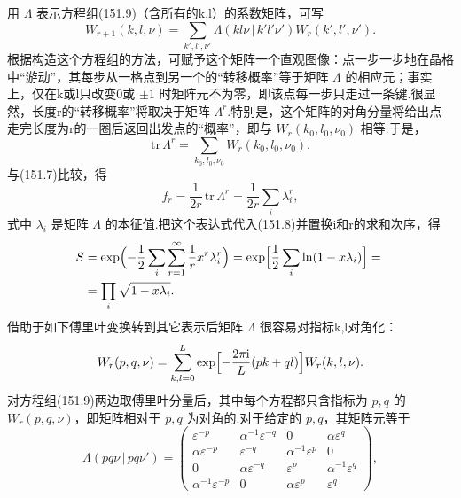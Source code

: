 用 $\Lambda$ 表示方程组(151.9)（含所有的k,l）的系数矩阵，可写
\begin{equation*}
  W_{r+1}(k,l,\nu)=\sum_{k',l',\nu'}
  \Lambda(kl\nu\,|\,k'l'\nu')W_r(k',l',\nu').
\end{equation*}
根据构造这个方程组的方法，可赋予这个矩阵一个直观图像：点一步一步地在晶格中“游动”，其每步从一格点到另一个的“转移概率”等于矩阵 $\Lambda$ 的相应元；事实上，仅在k或l只改变0或 $\pm1$ 时矩阵元不为零，即该点每一步只走过一条键.很显然，长度r的“转移概率”将取决于矩阵 $\Lambda^r$.特别是，这个矩阵的对角分量将给出点走完长度为r的一圈后返回出发点的“概率”，即与 $W_r(k_0,l_0,\nu_0)$ 相等.于是，
\begin{equation*}
  \mathrm{tr}\,\Lambda^r=\sum_{k_0,l_0,\nu_0}W_r(k_0,l_0,\nu_0).
\end{equation*}
与(151.7)比较，得
\begin{equation*}
  f_r=\frac{1}{2r}\,\mathrm{tr}\,\Lambda^r
  =\frac{1}{2r}\sum_i\lambda_i^r,
\end{equation*}
式中 $\lambda_i$ 是矩阵 $\Lambda$ 的本征值.把这个表达式代入(151.8)并置换i和r的求和次序，得
\begin{equation}
\begin{aligned}
  S&=\exp\Bigl(-\frac{1}{2}\sum_i\sum_{r=1}^{\infty}\frac{1}{r}x^r\lambda_i^r\Bigr)
  =\exp\Bigl[\frac{1}{2}\sum_i\ln(1-x\lambda_i)\Bigr]={}\\
  &=\prod_i\sqrt{1-x\lambda_i}.
\end{aligned}
\end{equation}
借助于如下傅里叶变换转到其它表示后矩阵 $\Lambda$ 很容易对指标k,l对角化：
\begin{equation*}
  W_r(p,q,\nu)=\sum_{k,l=0}^{L}
  \exp\Bigl[-\frac{2\pi\mathrm{i}}{L}(pk+ql)\Bigr]W_r(k,l,\nu).
\end{equation*}
对方程组(151.9)两边取傅里叶分量后，其中每个方程都只含指标为 $p,q$ 的 $W_r(p,q,\nu)$，即矩阵相对于 $p,q$ 为对角的.对于给定的 $p,q$，其矩阵元等于
\begin{equation*}
  \Lambda(pq\nu\,|\,pq\nu')
  =\begin{pmatrix}
    \varepsilon^{-p} & \alpha^{-1}\varepsilon^{-q} & 0 & \alpha\varepsilon^{q}\\
    \alpha\varepsilon^{-p} & \varepsilon^{-q} & \alpha^{-1}\varepsilon^{p} & 0\\
    0 & \alpha\varepsilon^{-q} & \varepsilon^{p} & \alpha^{-1}\varepsilon^{q}\\
    \alpha^{-1}\varepsilon^{-p} & 0 & \alpha\varepsilon^{p} & \varepsilon^{q}
  \end{pmatrix},
\end{equation*}
